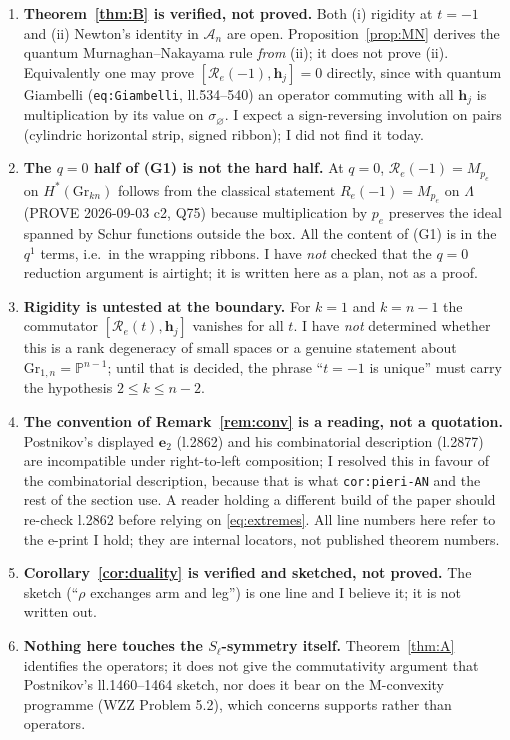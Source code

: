 \documentclass[11pt]{article}
\theoremstyle{plain}
\theoremstyle{definition}
\newcommand{\A}{\mathscr{A}}
\newcommand{\Gr}{\mathrm{Gr}}
\begin{document}
\begin{enumerate}
\item[(G1)] \textbf{Theorem~\ref{thm:B} is verified, not proved.}  Both
(i) rigidity at $t=-1$ and (ii) Newton's identity in $\A_n$ are open.
Proposition~\ref{prop:MN} derives the quantum Murnaghan--Nakayama rule
\emph{from} (ii); it does not prove (ii).  Equivalently one may prove
$[\mathcal R_e(-1),\mathbf h_j]=0$ directly, since with quantum Giambelli
(\texttt{eq:Giambelli}, ll.534--540) an operator commuting with all
$\mathbf h_j$ is multiplication by its value on $\sigma_\varnothing$.
I expect a sign-reversing involution on pairs
(cylindric horizontal strip, signed ribbon); I did not find it today.
\item[(G2)] \textbf{The $q=0$ half of (G1) is not the hard half.}  At
$q=0$, $\mathcal R_e(-1)=M_{p_e}$ on $H^*(\Gr_{kn})$ follows from the
classical statement $R_e(-1)=M_{p_e}$ on $\Lambda$ (PROVE 2026-09-03 c2,
Q75) because multiplication by $p_e$ preserves the ideal spanned by
Schur functions outside the box.  All the content of (G1) is in the
$q^1$ terms, i.e.\ in the wrapping ribbons.  I have \emph{not} checked
that the $q=0$ reduction argument is airtight; it is written here as a
plan, not as a proof.
\item[(G3)] \textbf{Rigidity is untested at the boundary.}  For $k=1$ and
$k=n-1$ the commutator $[\mathcal R_e(t),\mathbf h_j]$ vanishes for all
$t$.  I have \emph{not} determined whether this is a rank degeneracy of
small spaces or a genuine statement about $\Gr_{1,n}=\mathbb P^{n-1}$;
until that is decided, the phrase ``$t=-1$ is unique'' must carry the
hypothesis $2\le k\le n-2$.
\item[(G4)] \textbf{The convention of Remark~\ref{rem:conv} is a reading,
not a quotation.}  Postnikov's displayed $\mathbf e_2$ (l.2862) and his
combinatorial description (l.2877) are incompatible under right-to-left
composition; I resolved this in favour of the combinatorial description,
because that is what \texttt{cor:pieri-AN} and the rest of the section
use.  A reader holding a different build of the paper should re-check
l.2862 before relying on \eqref{eq:extremes}.  All line numbers here
refer to the e-print I hold; they are internal locators, not published
theorem numbers.
\item[(G5)] \textbf{Corollary~\ref{cor:duality} is verified and sketched,
not proved.}  The sketch (``$\rho$ exchanges arm and leg'') is one line
and I believe it; it is not written out.
\item[(G6)] \textbf{Nothing here touches the $S_\ell$-symmetry itself.}
Theorem~\ref{thm:A} identifies the operators; it does not give the
commutativity argument that Postnikov's ll.1460--1464 sketch, nor
does it bear on the M-convexity programme (WZZ Problem 5.2), which
concerns supports rather than operators.
\end{enumerate}
\end{document}
